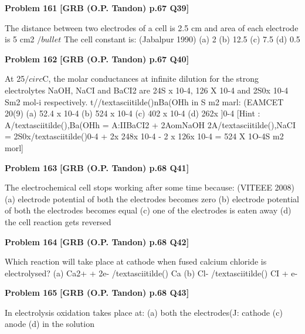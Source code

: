 \begin{problembox}
\textbf{Problem 161} \hfill \textbf{[GRB (O.P. Tandon) p.67 Q39]}
\label{q:ext-grb_all_questions-161}

The distance between two electrodes of a cell is 2.5 cm and 
area of each electrode is 5 cm2 $/bullet$ The cell constant is: 
(Jabalpur 1990) 
(a) 2 
(b) 12.5 
(c) 7.5 
(d) 0.5
\end{problembox}

\begin{problembox}
\textbf{Problem 162} \hfill \textbf{[GRB (O.P. Tandon) p.67 Q40]}
\label{q:ext-grb_all_questions-162}

At 25$/circ$C, the molar conductances at infinite dilution for the 
strong electrolytes NaOH, NaCI and BaCI2 are 24S x 10-4, 
126 X 10-4 and 2S0x 10-4 Sm2 mol-i respectively. t//textasciitilde()nBa(OHh 
in S m2 marl: 
(EAMCET 20(9) 
(a) 52.4 x 10-4 
(b) 524 x 10-4 
(c) 402 x 10-4 
(d) 262x ]0-4 
[Hint : A/textasciitilde(),Ba(OHh = A:IIBaCI2 + 2AomNaOH 
2A/textasciitilde(),NaCI 
= 2S0x/textasciitilde()0-4 + 2x 248x 10-4 - 2 x 126x 10-4 
= 524 X 1O-4S m2 morl]
\end{problembox}

\begin{problembox}
\textbf{Problem 163} \hfill \textbf{[GRB (O.P. Tandon) p.68 Q41]}
\label{q:ext-grb_all_questions-163}

The electrochemical cell stops working after some time 
because: 
(VITEEE 2008) 
(a) electrode potential of both the electrodes becomes zero 
(b) electrode potential of both the electrodes becomes equal 
(c) one of the electrodes is eaten away 
(d) the cell reaction gets reversed
\end{problembox}

\begin{problembox}
\textbf{Problem 164} \hfill \textbf{[GRB (O.P. Tandon) p.68 Q42]}
\label{q:ext-grb_all_questions-164}

Which reaction will take place at cathode when fused calcium 
chloride is electrolysed? 
(a) Ca2+ + 2e- /textasciitilde() 
Ca 
(b) Cl- /textasciitilde() 
CI + e-
\end{problembox}

\begin{problembox}
\textbf{Problem 165} \hfill \textbf{[GRB (O.P. Tandon) p.68 Q43]}
\label{q:ext-grb_all_questions-165}

In electrolysis oxidation takes place at: 
(a) both the electrodes(J:  cathode 
(c) anode 
(d) in the solution
\end{problembox}

